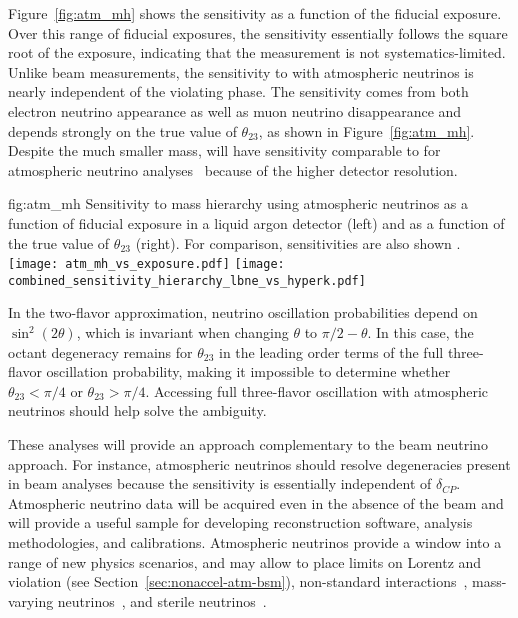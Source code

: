 Figure~\ref{fig:atm_mh} shows the  sensitivity as a function of the fiducial exposure. 
Over this range of fiducial exposures, the sensitivity essentially follows the square 
root of the exposure, indicating that the measurement is not systematics-limited. 
Unlike beam measurements, the sensitivity to  with atmospheric neutrinos is 
nearly independent of the  violating phase.  The sensitivity comes from both 
electron neutrino appearance as well as muon neutrino disappearance and depends strongly 
 on the true value of $\theta_{23}$, as shown in Figure~\ref{fig:atm_mh}.  Despite the
much smaller mass,  will have sensitivity comparable to \hyperk for atmospheric 
neutrino analyses~\cite{Kearns:2013lea} because of the higher detector resolution.

\begin{dunefigure}
{fig:atm_mh}
{Sensitivity to mass hierarchy using atmospheric neutrinos as a function of fiducial exposure in a liquid argon detector (left) and as a function of the true value of $\theta_{23}$ (right).  For comparison, \hyperk sensitivities are also shown \cite{Kearns:2013lea}.}
\texttt{[image: atm\_mh\_vs\_exposure.pdf]}
\texttt{[image: combined\_sensitivity\_hierarchy\_lbne\_vs\_hyperk.pdf]}
\end{dunefigure}

In the two-flavor approximation, neutrino oscillation probabilities depend on 
$\sin^2(2\theta)$, which is invariant when changing $\theta$ to $\pi/2-\theta$. In this case, the octant 
degeneracy remains for $\theta_{23}$ in the leading order terms of the full 
three-flavor oscillation probability, making it impossible to determine whether $\theta_{23}< \pi/4$ or 
$\theta_{23}> \pi/4$. Accessing full three-flavor oscillation with atmospheric neutrinos 
should help solve the ambiguity.


These analyses will provide an approach complementary to the beam neutrino approach. 
For instance, atmospheric neutrinos
should resolve 
degeneracies present in beam analyses because %
the  sensitivity is essentially independent of $\delta_{CP}$.   Atmospheric neutrino data will be acquired 
even in the absence of the beam and will provide a useful sample for developing
reconstruction software, analysis methodologies, and calibrations.  
Atmospheric neutrinos provide a window into a range of new physics scenarios, and %
may allow  to place limits on Lorentz and  violation (see Section~\ref{sec:nonaccel-atm-bsm}), 
non-standard interactions~\cite{Chatterjee:2014gxa}, mass-varying neutrinos~\cite{Abe:2008zza}, and
sterile neutrinos~\cite{Abe:2014gda}.

